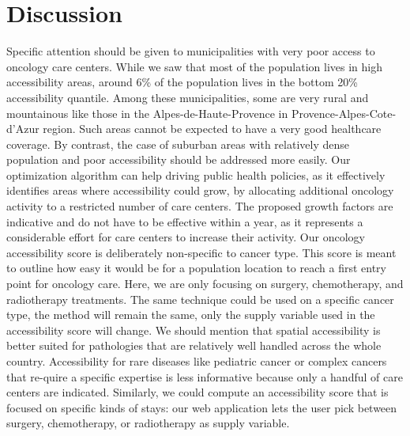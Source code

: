 \section{Discussion}

Specific attention should be given to municipalities with very poor access to oncology care centers. While we saw that most of the population lives in high accessibility areas, around 6\% of the population lives in the bottom 20\% accessibility quantile. Among these municipalities, some are very rural and mountainous like those in the Alpes-de-Haute-Provence in Provence-Alpes-Cote-d'Azur region. Such areas cannot be expected to have a very good healthcare coverage. By contrast, the case of suburban areas with relatively dense population and poor accessibility should be addressed more easily. Our optimization algorithm can help driving public health policies, as it effectively identifies areas where accessibility could grow, by allocating additional oncology activity to a restricted number of care centers. The proposed growth factors are indicative and do not have to be effective within a year, as it represents a considerable effort for care centers to increase their activity.
Our oncology accessibility score is deliberately non-specific to cancer type. This score is meant to outline how easy it would be for a population location to reach a first entry point for oncology care. Here, we are only focusing on surgery, chemotherapy, and radiotherapy treatments. The same technique could be used on a specific cancer type, the method will remain the same, only the supply variable used in the accessibility score will change. We should mention that spatial accessibility is better suited for pathologies that are relatively well handled across the whole country. Accessibility for rare diseases like pediatric cancer or complex cancers that re-quire a specific expertise is less informative because only a handful of care centers are indicated.
Similarly, we could compute an accessibility score that is focused on specific kinds of stays: our web application lets the user pick between surgery, chemotherapy, or radiotherapy as supply variable.
